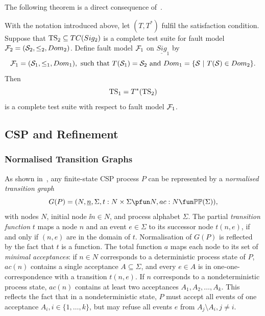  


 The following theorem is a direct consequence of~\cite[Theorem~2.1]{Huang2017}.

\begin{theorem}\label{th:theorytranslation}
With the notation introduced above, let  $(T,T^*)$ fulfil the satisfaction condition.
Suppose that ${\text{TS}}_2 \subseteq TC(Sig_2)$ is a complete test suite
for fault model ${\cal F}_2 = ({\cal S}_2,\le_2,Dom_2)$. Define fault model ${\cal F}_1$ on 
$\underline{Sig}_1$ by
$$
{\cal F}_1 = ({\cal S}_1,\le_1,Dom_1),\ \text{such that}\
T({\cal S}_1)  =  {\cal S}_2\ \text{and}\
Dom_1  =  \{ {\cal S}~|~T({\cal S})\in Dom_2 \}.
$$
Then
$$
{\text{TS}}_1 = T^*({\text{TS}}_2)
$$
is a complete test suite with respect to fault model ${\cal F}_1$.
\xbox
\end{theorem}

 
 


\subsection{CSP and Refinement}

\subsubsection*{Normalised Transition Graphs}

As shown in~\cite{Roscoe:1994:CME:197600}, any finite-state CSP process $P$ can be represented by a \emph{normalised transition graph} 
$$
G(P) = ( N, \ii n, \Sigma, t : N\times\Sigma \pfun N, ac : N \fun \mathbb{P}\mathbb{P}(\Sigma)),
$$
with nodes $N$, initial node $\ii n\in N$, and process alphabet $\Sigma$. The partial \emph{transition function} $t$ maps a node $n$ and an event $e\in\Sigma$ to its successor node $t(n,e)$, if and only if $(n,e)$ are in the domain of $t$. Normalisation of $G(P)$ is reflected 
by the fact that $t$ is a function. The total function $a$ maps each node to its set of \emph{minimal acceptances}: 
if $n\in N$ corresponds to a deterministic process state of $P$, $ac(n)$ contains a single acceptance $A\subseteq \Sigma$, and every $e\in A$ is in one-one-correspondence with a transition $t(n,e)$. If $n$ corresponds to a nondeterministic process state, $ac(n)$ contains at least two acceptances $A_1, A_2, \dots, A_k$. This reflects the fact that in a nondeterministic state, $P$ must accept all events of one acceptance 
$A_i, i \in \{ 1,\dots,k\}$, but may refuse all events $e$ from 
$A_j \setminus A_i, j\neq i$. 


